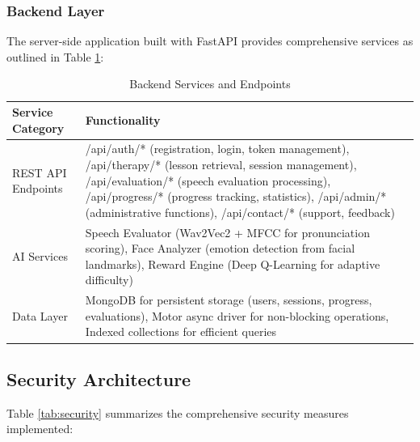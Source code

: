 \documentclass[12pt,a4paper]{article}
\begin{document}
\subsubsection{Backend Layer}

The server-side application built with FastAPI provides comprehensive services as outlined in Table \ref{tab:backend_services}:

\begin{table}[H]
\centering
\caption{Backend Services and Endpoints}
\label{tab:backend_services}
\begin{tabular}{p{4.5cm}p{9cm}}
\toprule
\textbf{Service Category} & \textbf{Functionality} \\
\midrule
REST API Endpoints & /api/auth/* (registration, login, token management), /api/therapy/* (lesson retrieval, session management), /api/evaluation/* (speech evaluation processing), /api/progress/* (progress tracking, statistics), /api/admin/* (administrative functions), /api/contact/* (support, feedback) \\
\hline
AI Services & Speech Evaluator (Wav2Vec2 + MFCC for pronunciation scoring), Face Analyzer (emotion detection from facial landmarks), Reward Engine (Deep Q-Learning for adaptive difficulty) \\
\hline
Data Layer & MongoDB for persistent storage (users, sessions, progress, evaluations), Motor async driver for non-blocking operations, Indexed collections for efficient queries \\
\bottomrule
\end{tabular}
\end{table}

\subsection{Security Architecture}

Table \ref{tab:security} summarizes the comprehensive security measures implemented:
\end{document}
